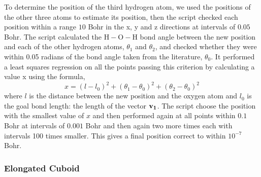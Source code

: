 \documentclass{article}
\begin{document}
\begin{multicols}{2}
To determine the position of the third hydrogen atom, we used the positions of the other three atoms to estimate its position, then the script checked each position within a range $10$ Bohr in the x, y and z directions at intervals of $0.05$ Bohr. The script calculated the $\text{H}-\text{O}-\text{H}$ bond angle between the new position and each of the other hydrogen atoms, $\theta_1$ and $\theta_2$, and checked whether they were within 0.05 radians of the bond angle taken from the literature, $\theta_0$.\cite{Tang1999} It performed a least squares regression on all the points passing this criterion by calculating a value x using the formula,
\begin{equation}
	x = (l - l_{0}) ^ 2 + (\theta_1 - \theta_0) ^ 2 +(\theta_2 - \theta_0) ^ 2
\end{equation}
where $l$ is the distance between the new position and the oxygen atom and $l_0$ is the goal bond length: the length of the vector $\bf{v}_1$. The script choose the position with the smallest value of $x$ and then performed again at all points within $0.1$ Bohr at intervals of $0.001$ Bohr and then again two more times each with intervals 100 times smaller. This gives a final position correct to within $10^{-7}$ Bohr. 

\subsubsection{Elongated Cuboid}
\label{sec:longbox}


\end{multicols}
\end{document}
